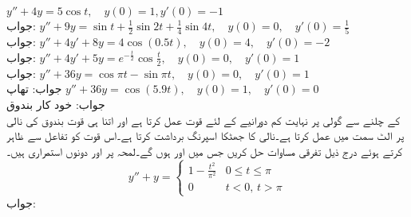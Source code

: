 \quad
$y''+4y=5\cos t,\quad y(0)=1,y'(0)=-1$\\
جواب:
\quad
$y''+9y=\sin t+\frac{1}{2}\sin 2t+\frac{1}{4}\sin 4t, \quad y(0)=0, \quad y'(0)=\frac{1}{5}$\\
جواب:
\quad
$y''+4y'+8y=4\cos( 0.5t), \quad y(0)=4, \quad y'(0)=-2$\\
جواب:
\quad
$y''+4y'+5y=e^{-\frac{t}{2}}\cos \frac{t}{2}, \quad y(0)=0, \quad y'(0)=1$\\
جواب:
\quad
$y''+36y=\cos \pi t-\sin \pi t, \quad y(0)=0, \quad y'(0)=1$\\
جواب:
\quad تھاپ \quad
$y''+36y=\cos (5.9t), \quad y(0)=1, \quad y'(0)=0$\\
جواب:
\quad خود کار بندوق \\
 کے چلنے سے گولی پر نہایت کم دورانیے کے لئے  قوت عمل کرتا ہے اور اتنا ہی قوت بندوق کی نالی پر الٹ سمت میں عمل کرتا ہے۔نالی کا جھٹکا اسپرنگ برداشت کرتا ہے۔اس قوت کو تفاعل  سے ظاہر کرتے ہوئے درج ذیل تفرقی مساوات حل کریں جس میں  اور  ہوں گے۔لمحہ  پر  اور  دونوں استمراری ہیں۔
\begin{equation*}
y''+y=
\begin{cases}
1-\frac{t^2}{\pi^2} & 0 \le t \le \pi\\
0 & t<0, \, t>\pi
\end{cases}
\end{equation*}
جواب:

